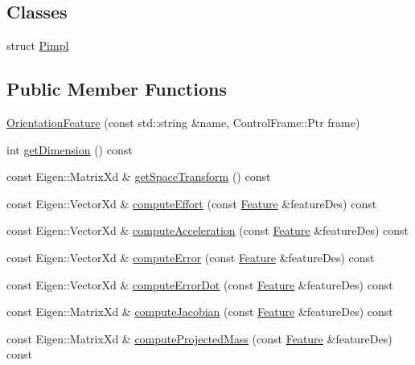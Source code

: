 \subsection*{Classes}
\begin{DoxyCompactItemize}
\item 
struct \hyperlink{structocra_1_1OrientationFeature_1_1Pimpl}{Pimpl}
\end{DoxyCompactItemize}
\subsection*{Public Member Functions}
\begin{DoxyCompactItemize}
\item 
\hyperlink{classocra_1_1OrientationFeature_acea2f5647dd31094ff4e83a77a89fdd8}{Orientation\+Feature} (const std\+::string \&name, Control\+Frame\+::\+Ptr frame)
\item 
int \hyperlink{classocra_1_1OrientationFeature_abcd6e706566b1434a0b08fd4efcfdf48}{get\+Dimension} () const 
\item 
const Eigen\+::\+Matrix\+Xd \& \hyperlink{classocra_1_1OrientationFeature_abea380f9b244fe89fc1d5b06f8e99288}{get\+Space\+Transform} () const 
\item 
const Eigen\+::\+Vector\+Xd \& \hyperlink{classocra_1_1OrientationFeature_abd85a094eb2c86380d96bb36199a70d3}{compute\+Effort} (const \hyperlink{classocra_1_1Feature}{Feature} \&feature\+Des) const 
\item 
const Eigen\+::\+Vector\+Xd \& \hyperlink{classocra_1_1OrientationFeature_a875a2d43a18c9937d43e2a7733f6aaf4}{compute\+Acceleration} (const \hyperlink{classocra_1_1Feature}{Feature} \&feature\+Des) const 
\item 
const Eigen\+::\+Vector\+Xd \& \hyperlink{classocra_1_1OrientationFeature_a564b09e34ba51f1ba7915d2f31946367}{compute\+Error} (const \hyperlink{classocra_1_1Feature}{Feature} \&feature\+Des) const 
\item 
const Eigen\+::\+Vector\+Xd \& \hyperlink{classocra_1_1OrientationFeature_a562105ad130e167455e6ef2cfcd8d052}{compute\+Error\+Dot} (const \hyperlink{classocra_1_1Feature}{Feature} \&feature\+Des) const 
\item 
const Eigen\+::\+Matrix\+Xd \& \hyperlink{classocra_1_1OrientationFeature_abc350ab3b4e72bd32482fbb109e20ae8}{compute\+Jacobian} (const \hyperlink{classocra_1_1Feature}{Feature} \&feature\+Des) const 
\item 
const Eigen\+::\+Matrix\+Xd \& \hyperlink{classocra_1_1OrientationFeature_a9247599065f1abb494ecd33258b69fc3}{compute\+Projected\+Mass} (const \hyperlink{classocra_1_1Feature}{Feature} \&feature\+Des) const 

\end{DoxyCompactItemize}
